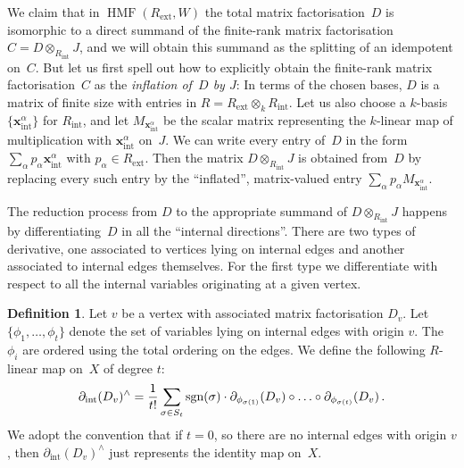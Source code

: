 \documentclass{compositio}
\theoremstyle{definition}
\newtheorem{definition}[theorem]{Definition}
\numberwithin{equation}{section}
\begin{document}
We claim that in $\operatorname{HMF}(R_{\text{ext}},W)$ the total matrix factorisation~$D$ is isomorphic to a direct summand of the finite-rank matrix factorisation $C=D\otimes_{R_{\text{int}}} J$, and we will obtain this summand as the splitting of an idempotent on~$C$. But let us first spell out how to explicitly obtain the finite-rank matrix factorisation~$C$ as the \emph{inflation of~$D$ by $J$}: In terms of the chosen bases, $D$ is a matrix of finite size with entries in $R=R_{\text{ext}}\otimes_{k}R_{\text{int}}$. Let us also choose a $k$-basis $\{\boldsymbol{x}_{\text{int}}^\alpha\}$ for $R_{\text{int}}$, and let $M_{\boldsymbol{x}_{\text{int}}^\alpha}$ be the scalar matrix representing the $k$-linear map of multiplication with $\boldsymbol{x}_{\text{int}}^\alpha$ on~$J$. We can write every entry of~$D$ in the form $\sum_{\alpha} p_{\alpha}  \boldsymbol{x}_{\text{int}}^\alpha$ with $p_{\alpha}\in R_{\text{ext}}$. Then the matrix $D\otimes _{R_{\text{int}}} J$ is obtained from~$D$ by replacing every such entry by the ``inflated'', matrix-valued entry $\sum_{\alpha} p_{\alpha} M_{\boldsymbol{x}_{\text{int}}^\alpha}$. 

The reduction process from $D$ to the appropriate summand of $D\otimes_{R_{\text{int}}} J$ happens by differentiating~$D$ in all the ``internal directions''. There are two types of derivative, one associated to vertices lying on internal edges and another associated to internal edges themselves. For the first type we differentiate with respect to all the internal variables originating at a given vertex.

\begin{definition} Let $v$ be a vertex with associated matrix factorisation $D_v$. Let $\{ \phi_1, \ldots, \phi_t \}$ denote the set of variables lying on internal edges with origin $v$. The $\phi_{i}$ are ordered using the total ordering on the edges. We define the following $R$-linear map on~$X$ of degree $t$:
$$
\partial_{\text{int}}(D_v)^{\wedge} = \frac{1}{t!} \sum_{\sigma \in S_t} \textup{sgn}(\sigma) \cdot \partial_{\phi_{\sigma(1)}}(D_v) \circ \ldots \circ \partial_{\phi_{\sigma(t)}}(D_v) \, .
$$
We adopt the convention that if $t = 0$, so there are no internal edges with origin $v$, then $\partial_{\text{int}}(D_v)^{\wedge}$ just represents the identity map on~$X$.
\end{definition}
\end{document}
